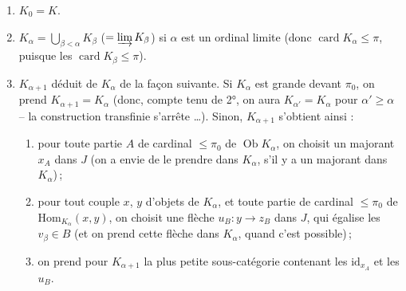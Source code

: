 \documentclass[11pt]{article}
\newcommand{\msp}[1]{\marginpar{\footnotesize [#1]}}
\newcommand{\card}{\operatorname{card}}
\newcommand{\Ob}{\operatorname{Ob}}
\begin{document}
\msp{page 169}
\begin{enumerate}
\item[1°)] $K_0 = K$.
\item[2°)] $K_{\alpha} = \bigcup_{\beta < \alpha} K_{\beta}$ ($= \varinjlim K_{\beta}$) si $\alpha$ est un ordinal limite (donc $\card K_{\alpha} \leqslant \pi$, puisque les $\card K_{\beta} \leqslant \pi$).
\item[3°)] $K_{\alpha+1}$ déduit de $K_{\alpha}$ de la façon suivante. Si $K_{\alpha}$ est grande devant $\pi_0$, on prend $K_{\alpha+1} = K_{\alpha}$ (donc, compte tenu de 2°, on aura $K_{\alpha'} = K_{\alpha}$ pour $\alpha' \geqslant \alpha$ -- la construction transfinie s’arrête \ldots). Sinon, $K_{\alpha+1}$ s’obtient ainsi :
\begin{enumerate}
\item[a)] pour toute partie $A$ de cardinal $\leqslant \pi_0$ de $\Ob K_{\alpha}$, on choisit un majorant $x_A$ dans $J$ (on a envie de le prendre dans $K_{\alpha}$, s’il y a un majorant dans $K_{\alpha}$)\,;
\item[b)] pour tout couple $x$, $y$ d’objets de $K_{\alpha}$, et toute partie de cardinal $\leqslant \pi_0$ de $\mathrm{Hom}_{K_{\alpha}}(x,y)$, on choisit une flèche $u_B : y \longrightarrow z_B$ dans $J$, qui égalise les $v_{\beta} \in B$ (et on prend cette flèche dans $K_{\alpha}$, quand c’est possible)\,;
\item[c)] on prend pour $K_{\alpha+1}$ la plus petite sous-catégorie contenant les $\mathrm{id}_{x_A}$ et les $u_B$.
\end{enumerate}
\end{enumerate}
\end{document}
